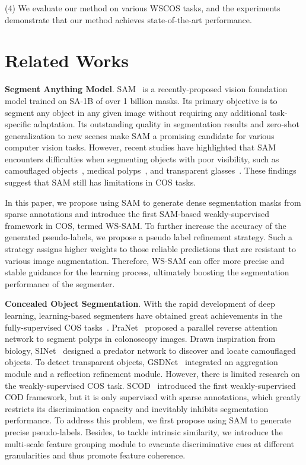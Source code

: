 (4) We evaluate our method on various WSCOS tasks, and the experiments demonstrate that our method achieves state-of-the-art performance.  

\section{Related Works}
\noindent \textbf{Segment Anything Model}. SAM~\cite{kirillov2023segment} is a recently-proposed vision foundation model trained on SA-1B of over 1 billion masks. Its primary objective is to segment any object in any given image without requiring any additional task-specific adaptation. Its outstanding quality in segmentation results and zero-shot generalization to new scenes make SAM a promising candidate for various computer vision tasks. However, recent studies have highlighted that SAM encounters difficulties when segmenting objects with poor visibility, such as camouflaged objects~\cite{ji2023sam,tang2023can,ji2023segment}, medical polyps~\cite{mazurowski2023segment,cheng2023sam,mattjie2023exploring,zhou2023can}, and transparent glasses~\cite{han2023segment,ji2023segment}. These findings suggest that SAM still has limitations in COS tasks.

In this paper, we propose using SAM to generate dense segmentation masks from sparse annotations and introduce the first SAM-based weakly-supervised framework in COS, termed WS-SAM. To further increase the accuracy of the generated pseudo-labels, we propose a pseudo label refinement strategy. Such a strategy assigns higher weights to those reliable predictions that are resistant to various image augmentation. Therefore, WS-SAM can offer more precise and stable guidance for the learning process, ultimately boosting the segmentation performance of the segmenter.

\noindent \textbf{Concealed Object Segmentation}. With the rapid development of deep learning, learning-based segmenters have obtained great achievements in the fully-supervised COS tasks~\cite{fan2020pranet,fan2020camouflaged,lin2021rich}. PraNet~\cite{fan2020pranet} proposed a parallel reverse attention network to segment polyps in colonoscopy images. Drawn inspiration from biology, SINet~\cite{fan2020camouflaged} designed a predator network to discover and locate camouflaged objects. To detect transparent objects, GSDNet~\cite{lin2021rich} integrated an aggregation module and a reflection refinement module. However, there is limited research on the weakly-supervised COS task. SCOD~\cite{he2022weakly} introduced the first weakly-supervised COD framework, but it is only supervised with sparse annotations, which greatly restricts its discrimination capacity and inevitably inhibits segmentation performance. To address this problem, we first propose using SAM to generate precise pseudo-labels. Besides, to tackle intrinsic similarity, we introduce the multi-scale feature grouping module to evacuate discriminative cues at different granularities and thus promote feature coherence.

